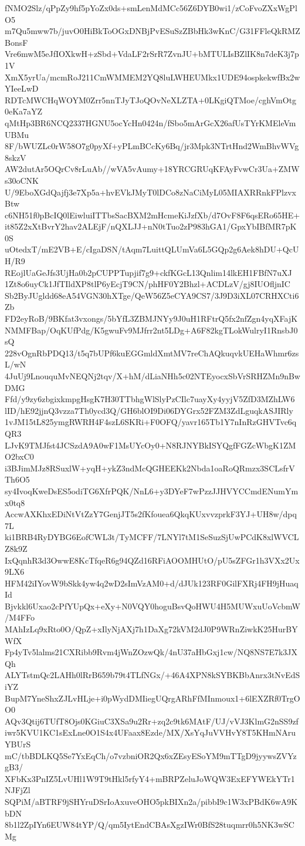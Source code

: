 fNMO2Slz/qPpZy9hf5pYoZx0ds+smLenMdMCc56Z6DYB0wi1/zCoFvoZXxWgPlO5
m7Qu5mww7b/juvO0HiBkToOGxDNBjPvESuSzZBbHk3wKnC/G31FFleQkRMZBonsF
Vre6mwM5eJfIOXkwH+zSbd+VdaLF2rSrR7ZvnJU+bMTULIsBZlIK8n7deK3j7p1V
XmX5yrUa/mcmRoJ211CmWMMEM2YQ8luLWHEUMkx1UDE94ospkekwfBx2wYIeeLwD
RDTcMWCHqWOYM0Zrr5nnTJyTJoQOvNeXLZTA+0LKgiQTMoe/cghVmOtg0eKa7aYZ
qMtHp3BR6NCQ2337HGNU5ocYcHn0424n/fSbo5mArGcX26afUsTYrKMEleVmUBMu
8F/bWUZLc0rW58O7g0pyXf+yPLmBCcKy6Bq/jr3Mpk3NTrtHnd2WmBhvWVg8skzV
AW2dutAr5OQrCv8rLuAb//wVA5vAumy+18YRCGRUqKFAyFvwCr3Ua+ZMWs30oCNK
U/9EboXGdQajfj3e7Xp5a+hvEVkJMyT0lDCo8zNaCiMyL05MIAXRRnkFPlzvxBtw
c6NH51f0pBcIQ0lEiwluiITTbsSacBXM2mHcmeKiJzfXb/d7OvF8F6qsERo65HE+
it85Z2xXtBvrY2hav2ALEjF/nQXLJJ+nN0tTuo2zP983hGA1/GpxYbIBfMR7pK0S
uOtedxT/mE2VB+E/cIgaDSN/tAqm7LuittQLUmVa6L5GQp2g6Aek8hDU+QcUH/R9
REojlUaGeJfs3UjHa0b2pCUPPTupjif7g9+ckfKGcL13Qnlim14lkEH1FBfN7uXJ
1Zt8o6uyCk1JfTIldXP8tlP6yEcjT9CN/phHF0Y2Bhzl+ACDLzV/gj8IUOfljnIC
Sb2ByJUgldd68eA54VGN30hXTge/QeW56Z5eCYA9CS7/3J9D3iXL07CRHXCti6Zb
FD2eyRoB/9BKfat3vxongs/5bYfL3ZBMJNYy9J0uH1RFtrQ5fx2nfZgn4yqXFajK
NMMFBap/OqKUfPdg/K5gwuFv9MJfrr2nt5LDg+A6F82kgTLokWulryI1RnsbJ0sQ
228vOgnRbPDQ13/t5q7bUPf6kuEGGmldXmtMV7reChAQkuqvkUEHaWhmr6zsL/wN
4JuUj9LnouquMvNEQNj2tqv/X+hM/dLiaNHh5c02NTEyocxSbVrSRHZMn9nBwDMG
Ffd/y9zy6zbgixkmpgHsgK7H30TTbhgWlSlyPzCIlc7uayXy4yyjV5ZfD3MZhLW6
lID/hE92jjnQ3vzza7Th0ycd3Q/GH6blOI9Di06DYGrx52FZM3ZdLguqkASJIRly
1vJM15tL825ymgRWRH4F4szL6SKRi+F0OFQ/yavr165Tb1Y7nInRzGHVTvc6qQR3
LJvK9TMJfst4JCSzdA9A0wF1MsUYcOy0+N8RJNYBkISYQgfFGZcWbgK1ZMO2bxC0
i3BJimMJz8RSuxlW+yqH+ykZ3ndMcQGHEEKk2Nbda1oaRoQRmzx3SCLsfrVTh6O5
sy4IvoqKweDsES5odiTG6XfrPQK/NnL6+y3DYeF7wPzzJJHVYCCmdENumYmx0tq8
AccwAXKhxEDiNtVtZzY7GenjJT5s2fKfouea6QkqKUxvvzprkF3YJ+UH8w/dpq7L
ki1BRB4RyDYBG6EofCWL3t/TyMCFF/7LNYl7tM1SeSuzSjUwPCdK8xlWVCLZ8k9Z
IxQqnhR3d3OwwE8KcTfqeR6g94QZd16RFiAOOMHUtO/pU5sZFGr1h3VXx2Ux9LX6
HFM42iIYovW9bSkk4yw4q2wD2sImVzAM0+d/dJUk123RF0GilFXRj4FH9jHuaqId
Bjvkkl6Uxao2cPfYUpQx+eXy+N0VQY0hoguBsvQoHWU4H5MUWxuUoVcbmW/M4FFo
MAhIzLq9xRto0O/QpZ+xIlyNjAXj7h1DaXg72kVM2dJ0P9WRnZiwkK25HurBYWfX
Fp4yTv5lalms21CXRibb9Rvm4jWnZOzwQk/4nU37aHbGxj1cw/NQ8NS7E7k3JXQh
ALYTstmQc2LAHh0lRrB659b79t4TLfNGx/+46A4XPN8kSYBKBbAnrx3tNvEdSiYZ
BupM7YneShxZJLvHLje+i0pWydDMIiegUQrgARhFfMInmoux1+6lEXZRf0TrgOO0
AQv3Qtij6TUfT8Ojs0KGiuC3XSa9u2Rr+zq2c9tk6MAtF/UJ/vVJ3KlmG2nSS9zf
iwr5KVU1KC1sExLne0O1S4x4UFaax8Ezde/MX/XsYqJuVVHvY8T5KHmNAruYBUrS
mC/tbBDLKQ5Se7YxEqCh/o7vzbniOR2Qx6xZEsyESoYM9mTTgD9jyywsZVYzgB3/
XFbKx3PnIZ5LvUHl1W9T9tHkl5rfyY4+mBRPZeluJoWQW3ExEFYWEkYTr1NJFjZl
SQPiM/aBTRF9jSHYruDSrIoAxuveOHO5pkBIXn2a/pibbI9c1W3xPBdK6wA9KbDN
8b1l2ZpIYn6EUW84tYP/Q/qm5IytEndCBAsXgzIWr0BfS28tuqmrr0h5NK3wSCMg
